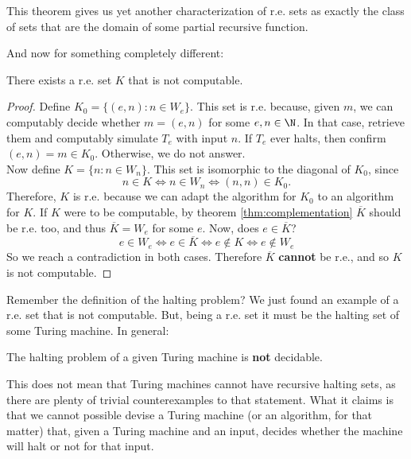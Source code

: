 \documentclass[../main.tex]{memoir}
\begin{document}
\begin{remark}
  This theorem gives us yet another characterization of r.e. sets as exactly the class of sets that are the domain of some partial recursive function.
\end{remark}

And now for something completely different:

\begin{theorem}
  \label{thm:re-not-r-set}
  There exists a r.e. set $K$ that is not computable.
\end{theorem}
\begin{proof}
  Define $K_0 = \{(e, n): n \in W_e \}$. This set is r.e. because, given $m$, we can computably decide whether $m = (e, n)$ for some $e, n \in \N$. In that case, retrieve them and computably simulate $T_e$ with input $n$. If $T_e$ ever halts, then confirm $(e, n) = m \in K_0$. Otherwise, we do not answer. \\
  Now define $K = \{n: n \in W_n\}$. This set is isomorphic to the diagonal of $K_0$, since
  \[ n \in K \iff n \in W_n \iff (n, n) \in K_0. \]
  Therefore, $K$ is r.e. because we can adapt the algorithm for $K_0$ to an algorithm for $K$.
  If $K$ were to be computable, by theorem \ref{thm:complementation} $\overline{K}$ should be r.e. too, and thus $\overline{K} = W_e$ for some $e$. Now, does $e \in \overline{K}$?
  \[ e \in W_e \iff e \in \overline{K} \iff e \not\in K \iff e \not\in W_e \]
  So we reach a contradiction in both cases. Therefore $\overline{K}$ \textbf{cannot} be r.e., and so $K$ is not computable.
\end{proof}

Remember the definition of the halting problem? We just found an example of a r.e. set that is not computable. But, being a r.e. set it must be the halting set of some Turing machine. In general:

\begin{corollary}
  The halting problem of a given Turing machine is \textbf{not} decidable.
\end{corollary}

This does not mean that Turing machines cannot have recursive halting sets, as there are plenty of trivial counterexamples to that statement. What it claims is that we cannot possible devise a Turing machine (or an algorithm, for that matter) that, given a Turing machine and an input, decides whether the machine will halt or not for that input. \\

\end{document}
